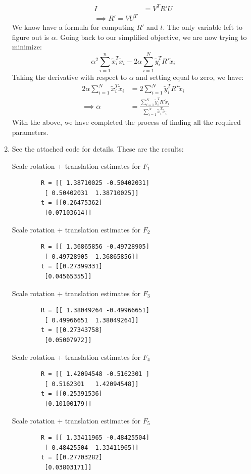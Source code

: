 \documentclass[12pt]{exam}
\begin{document}
\begin{questions}
\begin{solution}
\begin{enumerate}[label=(\alph*)]
       \begin{align*}
        I &= V^TR'U \\
        \implies R' = VU^T \tag{Inverse of orthonormal matrices is transpose}
       \end{align*}
       We know have a formula for computing $R'$ and $t$. The only variable left to figure out is $\alpha$. Going back to our simplified objective, we are now trying to minimize:
       \[
        \alpha^2\sum_{i=1}^n \tilde{x}_i^T\tilde{x}_i - 2\alpha \sum_{i=1}^N \tilde{y}_i^T R' \tilde{x}_i
       \]
       Taking the derivative with respect to $\alpha$ and setting equal to zero, we have:
       \begin{align*}
        2\alpha \sum_{i=1}^N \tilde{x}_i^T\tilde{x}_i &= 2\sum_{i=1}^N \tilde{y}_i^TR'\tilde{x}_i \\
        \implies \alpha &= \frac{\sum_{i=1}^N \tilde{y}_i^TR'\tilde{x}_i}{\sum_{i=1}^N \tilde{x}_i^T\tilde{x}_i}
       \end{align*}
      With the above, we have completed the process of finding all the required parameters.
      \item See the attached code for details. These are the results:

      Scale rotation + translation estimates for $F_1$
      \begin{verbatim}
        R = [[ 1.38710025 -0.50402031]
         [ 0.50402031  1.38710025]]
        t = [[0.26475362]
         [0.07103614]]
      \end{verbatim}
        Scale rotation + translation estimates for $F_2$
        \begin{verbatim}
        R = [[ 1.36865856 -0.49728905]
         [ 0.49728905  1.36865856]]
        t = [[0.27399331]
         [0.04565355]]
        \end{verbatim}
        Scale rotation + translation estimates for $F_3$
        \begin{verbatim}
        R = [[ 1.38049264 -0.49966651]
         [ 0.49966651  1.38049264]]
        t = [[0.27343758]
         [0.05007972]]
        \end{verbatim}
        Scale rotation + translation estimates for $F_4$
        \begin{verbatim}
        R = [[ 1.42094548 -0.5162301 ]
         [ 0.5162301   1.42094548]]
        t = [[0.25391536]
         [0.10100179]]
        \end{verbatim}
        Scale rotation + translation estimates for $F_5$
        \begin{verbatim}
        R = [[ 1.33411965 -0.48425504]
         [ 0.48425504  1.33411965]]
        t = [[0.27703282]
         [0.03803171]]
        \end{verbatim}


\end{enumerate}
\end{solution}
\end{questions}
\end{document}
